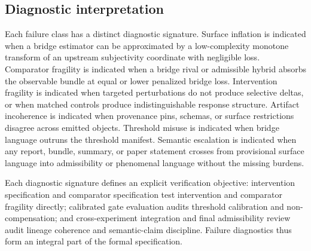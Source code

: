\documentclass[11pt,a4paper]{article}
\theoremstyle{definition}
\begin{document}
\subsection{Diagnostic interpretation}
Each failure class has a distinct diagnostic signature. Surface inflation is indicated when a bridge estimator can be approximated by a low-complexity monotone transform of an upstream subjectivity coordinate with negligible loss. Comparator fragility is indicated when a bridge rival or admissible hybrid absorbs the observable bundle at equal or lower penalized bridge loss. Intervention fragility is indicated when targeted perturbations do not produce selective deltas, or when matched controls produce indistinguishable response structure. Artifact incoherence is indicated when provenance pins, schemas, or surface restrictions disagree across emitted objects. Threshold misuse is indicated when bridge language outruns the threshold manifest. Semantic escalation is indicated when any report, bundle, summary, or paper statement crosses from provisional surface language into admissibility or phenomenal language without the missing burdens.

Each diagnostic signature defines an explicit verification objective: intervention specification and comparator specification test intervention and comparator fragility directly; calibrated gate evaluation audits threshold calibration and non-compensation; and cross-experiment integration and final admissibility review audit lineage coherence and semantic-claim discipline. Failure diagnostics thus form an integral part of the formal specification.
\end{document}
